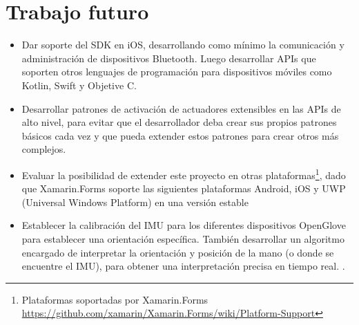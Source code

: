 \section{Trabajo futuro}

\begin{itemize}
	
	\item Dar soporte del SDK en iOS, desarrollando como mínimo la comunicación y administración de dispositivos Bluetooth. Luego desarrollar APIs que soporten otros lenguajes de programación para dispositivos móviles como Kotlin, Swift y Objetive C.
	
	\item Desarrollar patrones de activación de actuadores extensibles en las APIs de alto nivel, para evitar que el desarrollador deba crear sus propios patrones básicos cada vez y que pueda extender estos patrones para crear otros más complejos.
	
	
	\item Evaluar la posibilidad de extender este proyecto en otras plataformas\footnote{Plataformas soportadas por Xamarin.Forms \url{https://github.com/xamarin/Xamarin.Forms/wiki/Platform-Support}}, dado que Xamarin.Forms soporte las siguientes plataformas Android, iOS y UWP (Universal Windows Platform) en una versión estable
	
	\item Establecer la calibración  del IMU para los diferentes dispositivos OpenGlove para establecer una orientación específica. También desarrollar un algoritmo encargado de interpretar la orientación y posición de la mano (o donde se encuentre el IMU), para obtener una interpretación precisa en tiempo real.
	.
\end{itemize}
